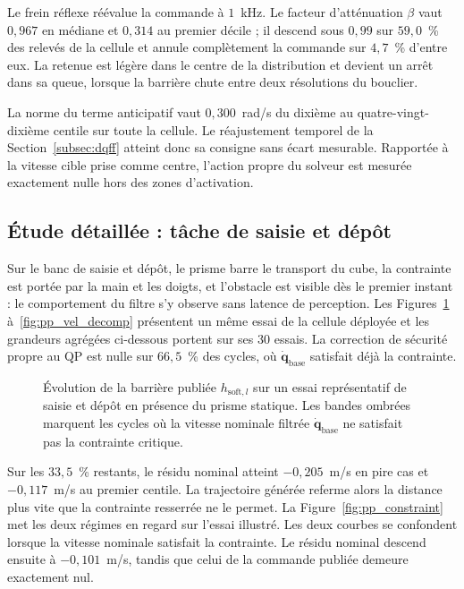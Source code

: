 Le frein réflexe réévalue la commande à $1$~kHz. Le facteur d'atténuation $\beta$ vaut $0{,}967$ en médiane et $0{,}314$ au premier décile ; il descend sous $0{,}99$ sur $59{,}0$~\% des relevés de la cellule et annule complètement la commande sur $4{,}7$~\% d'entre eux. La retenue est légère dans le centre de la distribution et devient un arrêt dans sa queue, lorsque la barrière chute entre deux résolutions du bouclier.

La norme du terme anticipatif vaut $0{,}300$~rad/s du dixième au quatre-vingt-dixième centile sur toute la cellule. Le réajustement temporel de la Section~\ref{subsec:dqff} atteint donc sa consigne sans écart mesurable. Rapportée à la vitesse cible prise comme centre, l'action propre du solveur est mesurée exactement nulle hors des zones d'activation.

\FloatBarrier

\subsection{Étude détaillée : tâche de saisie et dépôt}\label{subsec:res_pp_deep}
Sur le banc de saisie et dépôt, le prisme barre le transport du cube, la contrainte est portée par la main et les doigts, et l'obstacle est visible dès le premier instant : le comportement du filtre s'y observe sans latence de perception. Les Figures~\ref{fig:pp_deep} à~\ref{fig:pp_vel_decomp} présentent un même essai de la cellule déployée et les grandeurs agrégées ci-dessous portent sur ses $30$ essais. La correction de sécurité propre au \ac{QP} est nulle sur $66{,}5$~\% des cycles, où $\dot{\mathbf{q}}_{\mathrm{base}}$ satisfait déjà la contrainte.

\begin{figure}[!htbp]
    \centering
    
    \caption[Évolution de la barrière publiée (saisie et dépôt)]{Évolution de la barrière publiée $h_{\mathrm{soft},l}$ sur un essai représentatif de saisie et dépôt en présence du prisme statique. Les bandes ombrées marquent les cycles où la vitesse nominale filtrée $\dot{\mathbf{q}}_{\mathrm{base}}$ ne satisfait pas la contrainte critique.}\label{fig:pp_deep}
\end{figure}

Sur les $33{,}5$~\% restants, le résidu nominal atteint $-0{,}205$~m/s en pire cas et $-0{,}117$~m/s au premier centile. La trajectoire générée referme alors la distance plus vite que la contrainte resserrée ne le permet. La Figure~\ref{fig:pp_constraint} met les deux régimes en regard sur l'essai illustré. Les deux courbes se confondent lorsque la vitesse nominale satisfait la contrainte. Le résidu nominal descend ensuite à $-0{,}101$~m/s, tandis que celui de la commande publiée demeure exactement nul.


